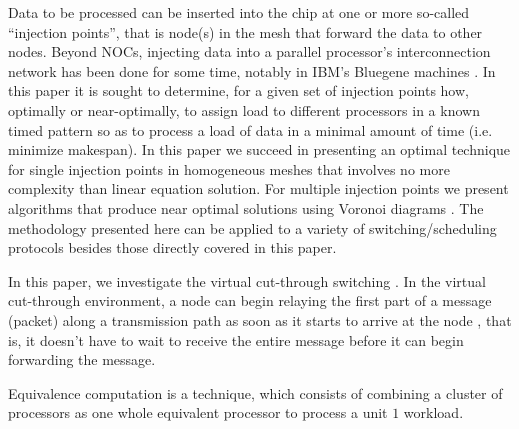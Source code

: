 Data to be processed can be inserted into the chip at one or more so-called “injection points”, that is node(s) in the mesh that forward the data to other nodes.  Beyond NOCs, injecting data into a parallel processor’s interconnection network has been done for some time, notably in IBM’s Bluegene machines \cite{krevat2002job}.  In this paper it is sought to determine, for a given set of injection points how, optimally or near-optimally, to assign load to different processors in a known timed pattern so as to process a load of data in a minimal amount of time (i.e. minimize makespan).  In this paper we succeed in presenting an optimal technique for single injection points in homogeneous meshes that involves no more complexity than linear equation solution.  For multiple injection points we present algorithms that produce near optimal solutions using Voronoi diagrams \cite{fortune1987sweepline} \cite{jia2010scheduling}.  The methodology presented here can be applied to a variety of switching/scheduling protocols besides those directly covered in this paper. 

In this paper, we investigate the virtual cut-through switching \cite{kermani1979virtual}.  In the virtual cut-through environment, a node can begin relaying the first part of a message (packet) along a transmission path as soon as it starts to arrive at the node , that is, it doesn't have to wait to receive the entire message before it can begin forwarding the message.

Equivalence computation \cite{robertazzi1993processor} is a technique, which consists of combining a cluster of processors as one whole equivalent processor to process a unit $1$ workload.